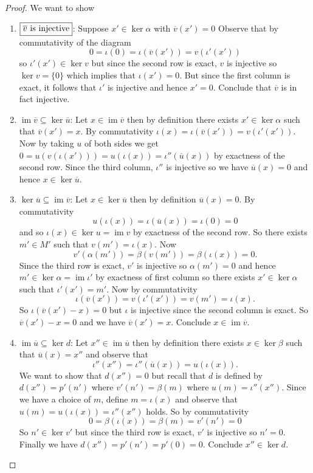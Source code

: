 \documentclass[8pt]{amsart}
\theoremstyle{plain}%
\theoremstyle{definition}
\theoremstyle{remark}
\numberwithin{equation}{section}
\newcommand{\im}{\operatorname{im}}
\begin{document}
\begin{proof}
	We want to show
	\begin{enumerate}
		\item $\boxed{\overline v$ is injective$}$: Suppose $x' \in \ker \alpha$ with $\overline v (x') = 0$ Observe that by commutativity of the diagram $$0 = \iota(0) = \iota(\overline v (x')) = v(\iota'(x'))$$ so $\iota'(x') \in \ker v$ but since the second row is exact, $v$ is injective so $\ker v = \{0\}$ which implies that $\iota(x') = 0$. But since the first column is exact, it follows that $\iota'$ is injective and hence $x' = 0$. Conclude that $\overline v$ is in fact injective.

		\item $\boxed{\im \overline v \subseteq \ker \overline u}$: Let $x \in \im \overline v$ then by definition there exists $x' \in \ker \alpha$ such that $\overline v(x') = x$. By commutativity $\iota(x) = \iota(\overline v(x')) = v(\iota'(x'))$. Now by taking $u$ of both sides we get $0 = u(v(\iota(x'))) = u(\iota(x)) = \iota''(\overline u(x))$ by exactness of the second row. Since the third column, $\iota''$ is injective so we have $\overline u(x) = 0$ and hence $x \in \ker \overline u$.

		\item $\boxed{\ker \overline u \subseteq \im \overline v}$: Let $x \in \ker \overline u$ then by definition $\overline u (x) = 0$. By commutativity $$u(\iota(x)) = \iota(\overline u(x)) = \iota(0) = 0$$ and so $\iota(x) \in \ker u = \im v$ by exactness of the second row. So there exists $m' \in M'$ such that $v(m') = \iota(x)$. Now $$v'(\alpha(m')) = \beta(v(m')) = \beta(\iota(x)) = 0.$$ Since the third row is exact, $v'$ is injective so $\alpha(m') = 0$ and hence $m' \in \ker \alpha = \im \iota'$ by exactness of first column so there exists $x' \in \ker \alpha$ such that $\iota'(x') = m'$. Now by commutativity $$\iota(\overline v(x')) = v(\iota'(x')) = v(m') = \iota(x).$$ So $\iota(\overline v (x') - x) = 0$ but $\iota$ is injective since the second column is exact. So $\overline v(x') - x = 0$ and we have $\overline v(x') = x$. Conclude $x \in \im \overline v$.

		\item $\boxed{\im \overline u \subseteq \ker d}$: Let $x'' \in \im \overline u$ then by definition there exists $x \in \ker \beta$ such that $\overline u(x) = x''$ and observe that $$\iota''(x'') = \iota''(\overline u(x)) = u(\iota(x)).$$ We want to show that $d(x'') = 0$ but recall that $d$ is defined by $d(x'') = p'(n')$ where $v'(n') = \beta(m)$ where $u(m) = \iota''(x'')$. Since we have a choice of $m$, define $m = \iota(x)$ and observe that $u(m) = u(\iota(x)) = \iota''(x'')$ holds. So by commutativity $$0 = \beta(\iota(x)) = \beta(m) = v'(n') = 0$$ So $n' \in \ker v'$ but since the third row is exact, $v'$ is injective so $n' = 0$. Finally we have $d(x'') = p'(n') = p'(0) = 0$. Conclude $x'' \in \ker d$.


\end{enumerate}
\end{proof}
\end{document}

